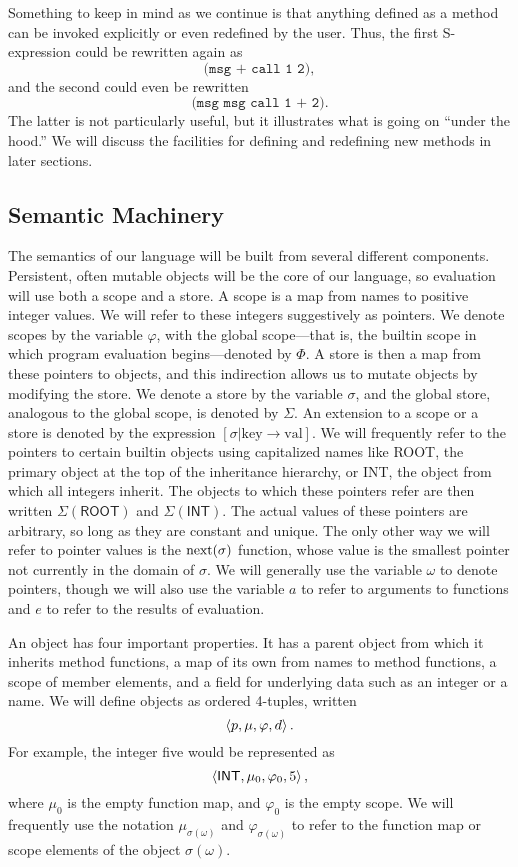 \documentclass[twocolumn]{article}
\begin{document}
Something to keep in mind as we continue is that anything defined as a
method can be invoked explicitly or even redefined by the user. Thus,
the first S-expression could be rewritten again as
\[ \texttt{(msg + call 1 2)}, \]
and the second could even be rewritten
\[ \texttt{(msg msg call 1 + 2)}. \] The latter is not particularly
useful, but it illustrates what is going on ``under the hood.'' We
will discuss the facilities for defining and redefining new methods in
later sections.

\subsection*{Semantic Machinery}
The semantics of our language will be built from several different
components. Persistent, often mutable objects will be the core of our
language, so evaluation will use both a scope and a store. A scope is
a map from names to positive integer values. We will refer to these
integers suggestively as pointers. We denote scopes by the variable
$\varphi$, with the global scope---that is, the builtin scope in which
program evaluation begins---denoted by $\Phi$. A store is then a map
from these pointers to objects, and this indirection allows us to
mutate objects by modifying the store. We denote a store by the
variable $\sigma$, and the global store, analogous to the global
scope, is denoted by $\Sigma$. An extension to a scope or a store is
denoted by the expression
$[\sigma|\text{key}\rightarrow\text{val}]$. We will frequently refer to
the pointers to certain builtin objects using capitalized names like
\textsf{ROOT}, the primary object at the top of the inheritance
hierarchy, or \textsf{INT}, the object from which all integers
inherit. The objects to which these pointers refer are then written
$\Sigma(\mathsf{ROOT})$ and $\Sigma(\mathsf{INT})$. The actual values
of these pointers are arbitrary, so long as they are constant and
unique. The only other way we will refer to pointer values is the
$\operatorname{next}(\sigma)$ function, whose value is the smallest pointer not
currently in the domain of $\sigma$. We will generally use the
variable $\omega$ to denote pointers, though we will also use the
variable $a$ to refer to arguments to functions and $e$ to refer to
the results of evaluation.

An object has four important properties. It has a parent object from
which it inherits method functions, a map of its own from names to
method functions, a scope of member elements, and a field for
underlying data such as an integer or a name. We will define objects
as ordered 4-tuples, written
\[ \left< p, \mu, \varphi, d \right> .\]
For example, the integer five would be represented as
\[ \left< \mathsf{INT}, \mu_0, \varphi_0, 5 \right>, \]
where $\mu_0$ is the empty function map, and $\varphi_0$ is the empty
scope. We will frequently use the notation $\mu_{\sigma(\omega)}$ and
$\varphi_{\sigma(\omega)}$ to refer to the function map or scope
elements of the object $\sigma(\omega)$.
\end{document}
